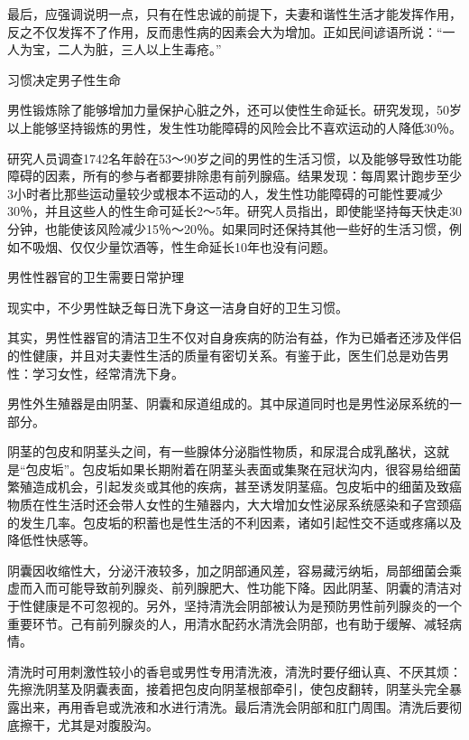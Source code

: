\documentclass[12pt,UTF8]{ctexbook}
\begin{document}
最后，应强调说明一点，只有在性忠诚的前提下，夫妻和谐性生活才能发挥作用，反之不仅发挥不了作用，反而患性病的因素会大为增加。正如民间谚语所说：“一人为宝，二人为脏，三人以上生毒疮。”





习惯决定男子性生命


男性锻炼除了能够增加力量保护心脏之外，还可以使性生命延长。研究发现，50岁以上能够坚持锻炼的男性，发生性功能障碍的风险会比不喜欢运动的人降低30％。

研究人员调查1742名年龄在53～90岁之间的男性的生活习惯，以及能够导致性功能障碍的因素，所有的参与者都要排除患有前列腺癌。结果发现：每周累计跑步至少3小时者比那些运动量较少或根本不运动的人，发生性功能障碍的可能性要减少30％，并且这些人的性生命可延长2～5年。研究人员指出，即使能坚持每天快走30分钟，也能使该风险减少15％～20％。如果同时还保持其他一些好的生活习惯，例如不吸烟、仅仅少量饮酒等，性生命延长10年也没有问题。





男性性器官的卫生需要日常护理


现实中，不少男性缺乏每日洗下身这一洁身自好的卫生习惯。

其实，男性性器官的清洁卫生不仅对自身疾病的防治有益，作为已婚者还涉及伴侣的性健康，并且对夫妻性生活的质量有密切关系。有鉴于此，医生们总是劝告男性：学习女性，经常清洗下身。

男性外生殖器是由阴茎、阴囊和尿道组成的。其中尿道同时也是男性泌尿系统的一部分。

阴茎的包皮和阴茎头之间，有一些腺体分泌脂性物质，和尿混合成乳酪状，这就是“包皮垢”。包皮垢如果长期附着在阴茎头表面或集聚在冠状沟内，很容易给细菌繁殖造成机会，引起发炎或其他的疾病，甚至诱发阴茎癌。包皮垢中的细菌及致癌物质在性生活时还会带人女性的生殖器内，大大增加女性泌尿系统感染和子宫颈癌的发生几率。包皮垢的积蓄也是性生活的不利因素，诸如引起性交不适或疼痛以及降低性快感等。

阴囊因收缩性大，分泌汗液较多，加之阴部通风差，容易藏污纳垢，局部细菌会乘虚而入而可能导致前列腺炎、前列腺肥大、性功能下降。因此阴茎、阴囊的清洁对于性健康是不可忽视的。另外，坚持清洗会阴部被认为是预防男性前列腺炎的一个重要环节。己有前列腺炎的人，用清水配药水清洗会阴部，也有助于缓解、减轻病情。

清洗时可用刺激性较小的香皂或男性专用清洗液，清洗时要仔细认真、不厌其烦：先擦洗阴茎及阴囊表面，接着把包皮向阴茎根部牵引，使包皮翻转，阴茎头完全暴露出来，再用香皂或洗液和水进行清洗。最后清洗会阴部和肛门周围。清洗后要彻底擦干，尤其是对腹股沟。
\end{document}
